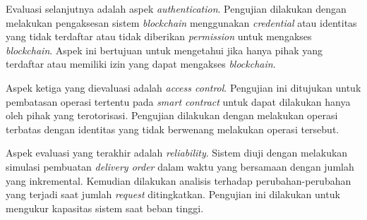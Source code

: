 Evaluasi selanjutnya adalah aspek \textit{authentication}. Pengujian dilakukan dengan melakukan pengaksesan sistem \textit{blockchain} menggunakan \textit{credential} atau identitas yang tidak terdaftar atau tidak diberikan \textit{permission} untuk mengakses \textit{blockchain}. Aspek ini bertujuan untuk mengetahui jika hanya pihak yang terdaftar atau memiliki izin yang dapat mengakses \textit{blockchain}.

Aspek ketiga yang dievaluasi adalah \textit{access control}. Pengujian ini ditujukan untuk pembatasan operasi tertentu pada \textit{smart contract} untuk dapat dilakukan hanya oleh pihak yang terotorisasi. Pengujian dilakukan dengan melakukan operasi terbatas dengan identitas yang tidak berwenang melakukan operasi tersebut.

Aspek evaluasi yang terakhir adalah \textit{reliability}. Sistem diuji dengan melakukan simulasi pembuatan \textit{delivery order} dalam waktu yang bersamaan dengan jumlah yang inkremental. Kemudian dilakukan analisis terhadap perubahan-perubahan yang terjadi saat jumlah \textit{request} ditingkatkan. Pengujian ini dilakukan untuk mengukur kapasitas sistem saat beban tinggi.

